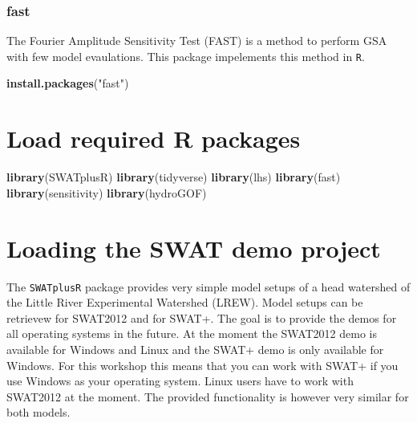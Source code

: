 \documentclass[11pt,]{article}
\newenvironment{Shaded}{\begin{snugshade}}{\end{snugshade}}
\newcommand{\KeywordTok}[1]{\textcolor[rgb]{0.13,0.29,0.53}{\textbf{#1}}}
\newcommand{\StringTok}[1]{\textcolor[rgb]{0.31,0.60,0.02}{#1}}
\newcommand{\NormalTok}[1]{#1}
\begin{document}
\subsubsection{fast}\label{fast}

The Fourier Amplitude Sensitivity Test (FAST) is a method to perform GSA
with few model evaulations. This package impelements this method in
\texttt{R}.

\begin{Shaded}
\begin{Highlighting}[]
\KeywordTok{install.packages}\NormalTok{(}\StringTok{"fast"}\NormalTok{)}
\end{Highlighting}
\end{Shaded}

\newpage

\section{Load required R packages}\label{load-required-r-packages}

\begin{Shaded}
\begin{Highlighting}[]
\KeywordTok{library}\NormalTok{(SWATplusR)}
\KeywordTok{library}\NormalTok{(tidyverse)}
\KeywordTok{library}\NormalTok{(lhs)}
\KeywordTok{library}\NormalTok{(fast)}
\KeywordTok{library}\NormalTok{(sensitivity)}
\KeywordTok{library}\NormalTok{(hydroGOF)}
\end{Highlighting}
\end{Shaded}

\section{Loading the SWAT demo
project}\label{loading-the-swat-demo-project}

The \texttt{SWATplusR} package provides very simple model setups of a
head watershed of the Little River Experimental Watershed (LREW). Model
setups can be retrievew for SWAT2012 and for SWAT+. The goal is to
provide the demos for all operating systems in the future. At the moment
the SWAT2012 demo is available for Windows and Linux and the SWAT+ demo
is only available for Windows. For this workshop this means that you can
work with SWAT+ if you use Windows as your operating system. Linux users
have to work with SWAT2012 at the moment. The provided functionality is
however very similar for both models.
\end{document}

